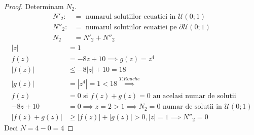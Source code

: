 \begin{aplicatie}
\begin{proof}
        Determinam $N_2$.
        \begin{align*}
            N'_2 :&= \text{ numarul solutiilor ecuatiei in } \mathcal{U}(0;1) \\
            N''_2 :&= \text{ numarul solutiilor ecuatiei pe } \partial \mathcal{U}(0;1) \\
            N_2 &= N'_2 + N''_2
        \end{align*}
        \begin{align*}
            |z| & = 1 \\
            f(z) & = -8z + 10 \implies g(z) = z^4 \\
            |f(z)| &\leq -8|z| + 10 =  18 \\
            |g(z)| &= |z^4| = 1 < 18 \overset{T.Rouche}{\implies}\\
            f(z) &= 0 \text{ si } f(z) + g(z) = 0 \text{ au acelasi numar de solutii }\\
            -8z + 10 &= 0 \implies z = 2 > 1 \implies N_2 = 0 \text{ numar de solutii in } \mathcal{U}(0;1)\\
            |f(z) + g(z)| &\geq |f(z)| + |g(z)| > 0, |z| = 1 \implies N''_2 = 0
        \end{align*}
        Deci $N = 4-0 = 4$
    \end{proof}
\end{aplicatie}

